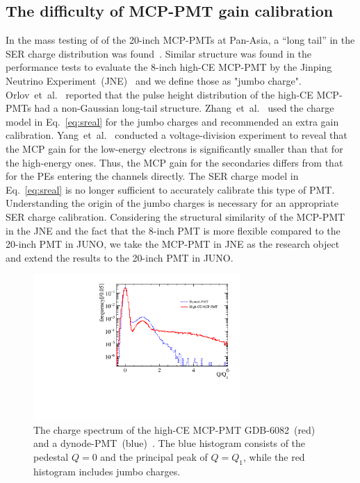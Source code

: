 \subsection{The difficulty of MCP-PMT gain calibration}
In the mass testing of of the 20-inch MCP-PMTs at Pan-Asia, a ``long tail'' in the SER charge distribution was found~\cite{JUNO:2022hlz}. Similar structure was found in the performance tests to evaluate the 8-inch high-CE MCP-PMT by the Jinping Neutrino Experiment~(JNE)~\cite{Zhang:2023ued} and we define those as "jumbo charge".
Orlov~et~al.~\cite{reviewer1} reported that the pulse height distribution of the high-CE MCP-PMTs had a non-Gaussian long-tail structure. Zhang~et~al.~\cite{2021Gain} used the charge model in Eq.~\eqref{eq:sreal} for the jumbo charges and recommended an extra gain calibration. Yang~et~al.~\cite{2017MCP} conducted a voltage-division experiment to reveal that the MCP gain for the low-energy electrons is significantly smaller than that for the high-energy ones.
Thus, the MCP gain for the secondaries differs from that for the PEs entering the channels directly.
The SER charge model in Eq.~\eqref{eq:sreal} is no longer sufficient to accurately calibrate this type of PMT.
Understanding the origin of the jumbo charges is necessary for an appropriate SER charge calibration.
Considering the structural similarity of the MCP-PMT in the JNE and the fact that the 8-inch PMT is more flexible compared to the 20-inch PMT in JUNO, we take the MCP-PMT in JNE as the research object and extend the results to the 20-inch PMT in JUNO.
\begin{figure}[!htbp]
	\centering
	\includegraphics[width=0.7\textwidth]{PMTRelated/GTmodel/spe.pdf}
	\caption{The charge spectrum of the high-CE MCP-PMT GDB-6082~(red) and a dynode-PMT~(blue)~\cite{Zhang:2023ued}.
		The blue histogram consists of the pedestal $Q=0$ and the principal peak of $Q=Q_1$, while the red histogram includes jumbo charges.}
	\label{fig:spe_sreal}
\end{figure}

